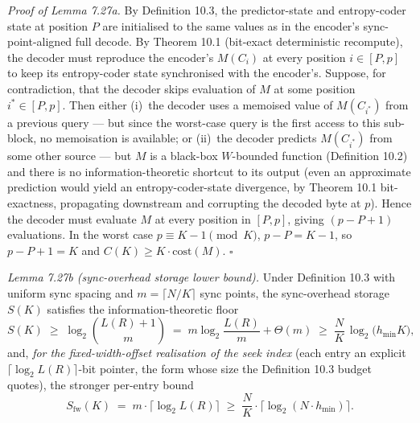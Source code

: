 \documentclass[
]{article}
\begin{document}
\emph{Proof of Lemma 7.27a.} By Definition 10.3, the
predictor-state and entropy-coder state at position $P$ are
initialised to the same values as in the encoder's sync-point-aligned
full decode. By Theorem 10.1 (bit-exact deterministic recompute), the
decoder must reproduce the encoder's $M(C_i)$ at every position
$i \in [P, p]$ to keep its entropy-coder state synchronised with the
encoder's. Suppose, for contradiction, that the decoder skips
evaluation of $M$ at some position $i^* \in [P, p]$. Then either
(i)~the decoder uses a memoised value of $M(C_{i^*})$ from a previous
query --- but since the worst-case query is the first access to this
sub-block, no memoisation is available; or (ii)~the decoder predicts
$M(C_{i^*})$ from some other source --- but $M$ is a black-box
$W$-bounded function (Definition 10.2) and there is no
information-theoretic shortcut to its output (even an approximate
prediction would yield an entropy-coder-state divergence, by
Theorem 10.1 bit-exactness, propagating downstream and corrupting
the decoded byte at $p$). Hence the decoder must evaluate $M$
at every position in $[P, p]$, giving $(p - P + 1)$ evaluations.
In the worst case $p \equiv K - 1 \pmod{K}$, $p - P = K - 1$, so
$p - P + 1 = K$ and $C(K) \geq K \cdot \mathrm{cost}(M)$.
\hfill$\square$

\emph{Lemma 7.27b (sync-overhead storage lower bound).} Under
Definition 10.3 with uniform sync spacing and $m = \lceil N/K
\rceil$ sync points, the sync-overhead storage $S(K)$ satisfies the
information-theoretic floor
\[
  S(K) \;\geq\; \log_2 \binom{L(R)+1}{m}
  \;=\; m \log_2\!\frac{L(R)}{m} + \Theta(m)
  \;\geq\; \frac{N}{K}\,\log_2\!\bigl(h_{\min} K\bigr) ,
\]
and, \emph{for the fixed-width-offset realisation of the seek index}
(each entry an explicit $\lceil \log_2 L(R)\rceil$-bit pointer, the
form whose size the Definition 10.3 budget quotes), the stronger
per-entry bound
\[
  S_{\mathrm{fw}}(K) \;=\; m \cdot \bigl\lceil \log_2 L(R) \bigr\rceil
  \;\geq\; \frac{N}{K} \cdot \bigl\lceil \log_2(N \cdot h_{\min})
  \bigr\rceil .
\]
\end{document}
